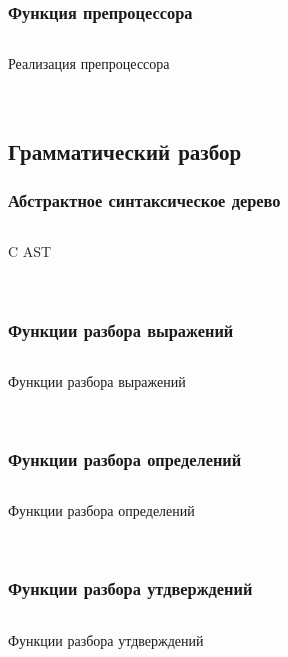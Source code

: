 \subsubsection{Функция препроцессора}
\begin{code}
  \inputminted[breaklines=true, xleftmargin=1em, linenos, frame=single,
  framesep=10pt, fontsize=\footnotesize]
  {c}{listings/pp/tokenize.c}
  \caption{Реализация препроцессора}
  \label{extras:pp}
\end{code}\


\subsection{Грамматический разбор}
\subsubsection{Абстрактное синтаксическое дерево}
\begin{code}
  \inputminted[breaklines=true, xleftmargin=1em, linenos, frame=single,
  framesep=10pt, fontsize=\footnotesize]
  {c}{listings/parsing/ast.c}
  \caption{C AST}
  \label{extras:c_ast}
\end{code}\

\subsubsection{Функции разбора выражений}
\begin{code}
  \inputminted[breaklines=true, xleftmargin=1em, linenos, frame=single,
  framesep=10pt, fontsize=\footnotesize]
  {c}{listings/parsing/expr.c}
  \caption{Функции разбора выражений}
  \label{extras:parse_expr}
\end{code}\

\subsubsection{Функции разбора определений}
\begin{code}
  \inputminted[breaklines=true, xleftmargin=1em, linenos, frame=single,
  framesep=10pt, fontsize=\footnotesize]
  {c}{listings/parsing/decl.c}
  \caption{Функции разбора определений}
  \label{extras:parse_decl}
\end{code}\

\subsubsection{Функции разбора утдверждений}
\begin{code}
  \inputminted[breaklines=true, xleftmargin=1em, linenos, frame=single,
  framesep=10pt, fontsize=\footnotesize]
  {c}{listings/parsing/stmt.c}
  \caption{Функции разбора утдверждений}
  \label{extras:parse_stmt}
\end{code}\

